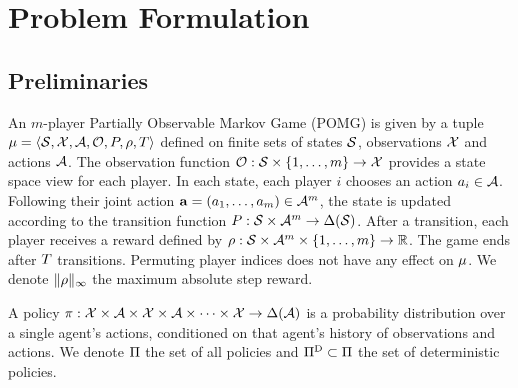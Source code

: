 \section{Problem Formulation}


\subsection{Preliminaries}

An $m$-player Partially Observable Markov Game (POMG) is given by a tuple $\mu = \langle \mathcal{S}, \mathcal{X}, \mathcal{A}, \mathcal{O}, P, \rho , T \rangle$ defined on finite sets of states $\mathcal{S}$,
observations $\mathcal{X}$ and actions $\mathcal{A}$. The observation function $\mathcal{O}: \mathcal{S} \times \{1, \dots, m\} \rightarrow \mathcal{X}$ provides a state space view for each player. In each state, each player $i$ chooses an action $a_i \in \mathcal{A}$. Following their joint action $\mathbf{a} = (a_1, \dots, a_m) \in \mathcal{A}^m$, the state is updated according to the transition function $P: \mathcal{S} \times \mathcal{A}^m \rightarrow \Delta(\mathcal{S})$. After a transition, each player receives a reward defined by $\rho: \mathcal{S} \times \mathcal{A}^m \times \{1, \dots, m\} \rightarrow \mathbb{R}$. The game ends after $T$ transitions. Permuting player indices does not have any effect on $\mu$. We denote $\lVert \rho \rVert_\infty$ the maximum absolute step reward.
    
A policy $\pi: \mathcal{X} \times \mathcal{A} \times \mathcal{X} \times \mathcal{A} \times \dots \times \mathcal{X} \rightarrow \Delta(\mathcal{A})$ is a probability distribution over a single agent's actions, conditioned on that agent's history of observations and actions. We denote $\Pi$ the set of all policies and $\Pi^\text{D} \subset \Pi$ the set of deterministic policies.

